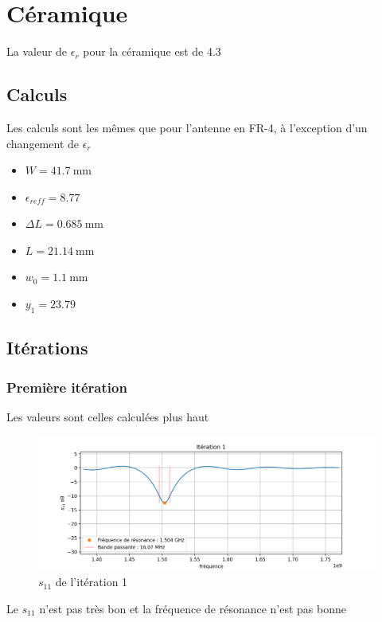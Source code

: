 \documentclass[Deriaz_Traiber_Labo02.tex]{subfiles}
\begin{document}
\section{Céramique}
La valeur de $\epsilon_r$ pour la céramique est de 4.3
\subsection{Calculs}
Les calculs sont les mêmes que pour l'antenne en FR-4, à l'exception d'un changement de $\epsilon_r$
\begin{itemize}
\item $W=\SI{41.7}{\milli\meter}$
\item $\epsilon_{reff}=8.77$
\item $\Delta L=\SI{0.685}{\milli\meter}$
\item $L=\SI{21.14}{\milli\meter}$
\item $w_0=\SI{1.1}{\milli\meter}$
\item $y_1=23.79$
\end{itemize}
\subsection{Itérations}
\subsubsection{Première itération}
Les valeurs sont celles calculées plus haut
\begin{figure}[H]
\centering
\includegraphics[width=15cm]{../Calculs/run_id_ceramique_1.png}
\caption[caption]{$s_{11}$ de l'itération 1}
\end{figure}
Le $s_{11}$ n'est pas très bon et la fréquence de résonance n'est pas bonne
\end{document}
